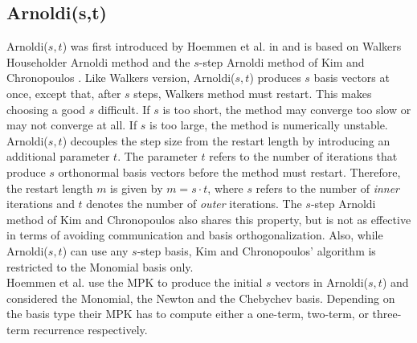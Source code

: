 \documentclass{scrartcl}
\numberwithin{equation}{section}
\begin{document}
\subsection{Arnoldi(s,t)}
Arnoldi($s,t$) was first introduced by Hoemmen et al. in \cite{Hoemmen:2010:CKS:1970638} and is based on Walkers Householder Arnoldi method \cite{doi:10.1137/Walker} and the $s$-step Arnoldi method of Kim and Chronopoulos \cite{Chronopoulos}. Like Walkers version, Arnoldi($s,t$) produces $s$ basis vectors at once, except that, after $s$ steps, Walkers method must restart. This makes choosing a good $s$ difficult. If $s$ is too short, the method may converge too slow or may not converge at all. If $s$ is too large, the method is numerically unstable.\\ Arnoldi($s,t$) decouples the step size from the restart length by introducing an additional parameter $t$. The parameter $t$ refers to the number of iterations that produce $s$ orthonormal basis vectors before the method must restart. Therefore, the restart length $m$ is given by $m = s \cdot t$, where $s$ refers to the number of \textit{inner} iterations and $t$ denotes the number of \textit{outer} iterations.
The $s$-step Arnoldi method of Kim and Chronopoulos also shares this property, but is not as effective in terms of avoiding communication and basis orthogonalization. Also, while Arnoldi($s,t$) can use any $s$-step basis, Kim and Chronopoulos' algorithm is restricted to the Monomial basis only.\\
Hoemmen et al. \cite{Hoemmen:2010:CKS:1970638} use the MPK to produce the initial $s$ vectors in Arnoldi($s,t$) and considered the Monomial, the Newton and the Chebychev basis. Depending on the basis type their MPK has to compute either a one-term, two-term, or three-term recurrence respectively.
\end{document}
